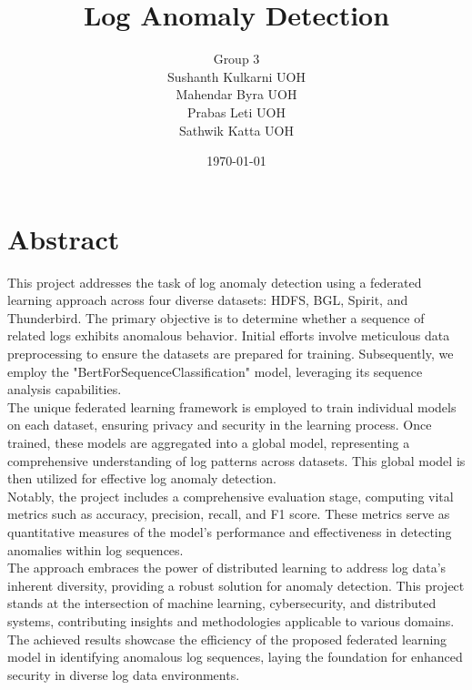 \documentclass[titlepage]{article}
\begin{document}
\title{\Huge Log Anomaly Detection}
\author{\large Group 3 \\ Sushanth Kulkarni UOH \\Mahendar Byra UOH \\Prabas Leti UOH \\Sathwik Katta UOH}
\date{\large \today}
\maketitle
\tableofcontents
\newpage

\section{Abstract}
This project addresses the task of log anomaly detection using a federated learning approach across four diverse datasets: HDFS, BGL, Spirit, and Thunderbird. The primary objective is to determine whether a sequence of related logs exhibits anomalous behavior. Initial efforts involve meticulous data preprocessing to ensure the datasets are prepared for training. Subsequently, we employ the "BertForSequenceClassification" model, leveraging its sequence analysis capabilities.\\
The unique federated learning framework is employed to train individual models on each dataset, ensuring privacy and security in the learning process. Once trained, these models are aggregated into a global model, representing a comprehensive understanding of log patterns across datasets. This global model is then utilized for effective log anomaly detection.\\
Notably, the project includes a comprehensive evaluation stage, computing vital metrics such as accuracy, precision, recall, and F1 score. These metrics serve as quantitative measures of the model's performance and effectiveness in detecting anomalies within log sequences. \\
The approach embraces the power of distributed learning to address log data's inherent diversity, providing a robust solution for anomaly detection. This project stands at the intersection of machine learning, cybersecurity, and distributed systems, contributing insights and methodologies applicable to various domains. The achieved results showcase the efficiency of the proposed federated learning model in identifying anomalous log sequences, laying the foundation for enhanced security in diverse log data environments.

\newpage
\end{document}
